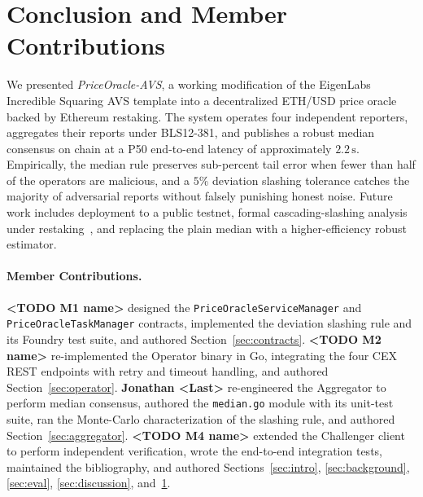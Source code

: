 \section{Conclusion and Member Contributions}
\label{sec:conclusion}

We presented \emph{PriceOracle-AVS}, a working modification of the
EigenLabs Incredible Squaring AVS template into a decentralized
ETH/USD price oracle backed by Ethereum restaking.  The system
operates four independent reporters, aggregates their reports under
BLS12-381, and publishes a robust median consensus on chain at a P50
end-to-end latency of approximately
$2.2\,\mathrm{s}$.  Empirically, the median rule preserves
sub-percent tail error when fewer than half of the operators are
malicious, and a $5\%$ deviation slashing tolerance catches the
majority of adversarial reports without falsely punishing honest
noise.  Future work includes deployment to a public
testnet, formal cascading-slashing analysis under
restaking~\cite{durvasula2024robust}, and replacing the plain median
with a higher-efficiency robust estimator.

\paragraph*{Member Contributions.}
\textbf{<TODO M1 name>} designed the
\texttt{PriceOracleServiceManager} and
\texttt{PriceOracleTaskManager} contracts, implemented the deviation
slashing rule and its Foundry test suite, and authored
Section~\ref{sec:contracts}.
\textbf{<TODO M2 name>} re-implemented the Operator binary in Go,
integrating the four CEX REST endpoints with retry and timeout
handling, and authored Section~\ref{sec:operator}.
\textbf{Jonathan <Last>} re-engineered the Aggregator to perform
median consensus, authored the \texttt{median.go} module with its
unit-test suite, ran the Monte-Carlo characterization of the
slashing rule, and authored Section~\ref{sec:aggregator}.
\textbf{<TODO M4 name>} extended the Challenger client to perform
independent verification, wrote the end-to-end integration tests,
maintained the bibliography, and authored
Sections~\ref{sec:intro}, \ref{sec:background}, \ref{sec:eval},
\ref{sec:discussion}, and~\ref{sec:conclusion}.
